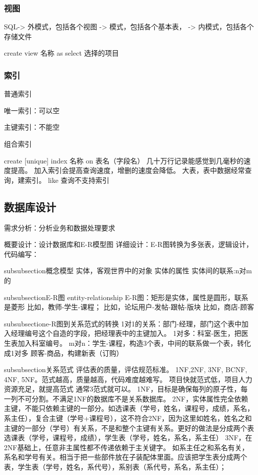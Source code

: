 \documentclass[UTF8]{../computerUniverse}
\begin{document}
    \subsubsection{视图}
    SQL-> 外模式，包括各个视图 -> 模式，包括各个基本表， -> 内模式，包括各个存储文件
    
    create view 名称 as select 选择的项目
    
    
    
    
    \subsubsection{索引}
    普通索引
    
    唯一索引：可以空
     
    主键索引：不能空
    
    组合索引
    
    create [unique] index 名称 on 表名（字段名）
    几十万行记录能感觉到几毫秒的速度提高。
    加入索引会提高查询速度，增删的速度会降低。
    大表，表中数据经常查询，建索引。
    like 查询不支持索引
    
    
    \subsection{数据库设计}
    需求分析：分析业务和数据处理要求
    
    概要设计：设计数据库和E-R模型图
    详细设计：E-R图转换为多张表，逻辑设计，
    代码编写：
    
    
    
    subsubsection{概念模型}
    实体，客观世界中的对象
    实体的属性
    实体间的联系:n对m的
    
    
    subsubsection{E-R图}
    entity-relationship
    E-R图：矩形是实体，属性是圆形，联系是菱形
    比如，教师-学生-课程；
    比如，论坛用户-发帖-跟帖-版块
    比如，商店-顾客
    
    subsubsection{e-R图到关系范式的转换}
    1对1的关系：部门-经理，部门这个表中加入经理编号这个自造的字段，把经理表中的主键加入。
    1对多：科室-医生，把医生表加入科室编号。
    m对n：学生-课程，构造3个表，中间的联系做一个表，转化成1对多
    顾客-商品，构建新表（订购）
    
    subsubsection{关系范式}
    评估表的质量，评估规范标准。
    1NF,2NF, 3NF, BCNF,  4NF, 5NF。范式越高，质量越高，代码难度越难写。
    项目快就范式低，项目人力资源充足，就提高范式
    通常3范式就可以。
    1NF，目标是确保每列的原子性，每一列不可分割。不满足1NF的数据库不是关系数据库。
    2NF，实体属性完全依赖主键，不能只依赖主键的一部分。如选课表（学号，姓名，课程号，成绩，系名，系主任），复合主键（学号+课程号），这不符合2NF，因为这里如姓名，姓名之和主键的一部分（学号）有关系，不是和整个主键有关系。更好的做法是分成两个表选课表（学号，课程号，成绩），学生表（学号，姓名，系名，系主任）
    3NF，在2NF基础上，任意非主属性都不传递依赖于主关键字。
    如系主任之和系名有关，系名和学号有关。相当于把一些部件放在子装配体里面。应该把学生表分成两个表，学生表（学号，姓名，系代号），系别表（系代号，系名，系主任）；
    
\end{document}
